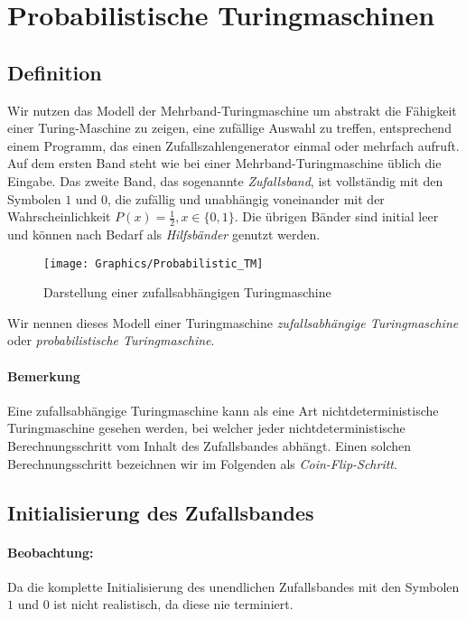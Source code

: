 \section{Probabilistische Turingmaschinen}
\subsection{Definition}
Wir nutzen das Modell der Mehrband-Turingmaschine um abstrakt die Fähigkeit einer Turing-Maschine zu zeigen, eine zufällige Auswahl zu treffen, entsprechend einem Programm, das einen Zufallszahlengenerator einmal oder mehrfach aufruft.
Auf dem ersten Band steht wie bei einer Mehrband-Turingmaschine üblich die Eingabe.
Das zweite Band, das sogenannte \emph{Zufallsband}, ist vollständig mit den Symbolen $1$ und $0$, die zufällig und unabhängig voneinander mit der Wahrscheinlichkeit $P(x) = \frac{1}{2}, x \in \{0, 1\}$.
Die übrigen Bänder sind initial leer und können nach Bedarf als \emph{Hilfsbänder} genutzt werden.

\begin{figure}[h]
	\centering
	\texttt{[image: Graphics/Probabilistic\_TM]}	
	\caption{Darstellung einer zufallsabhängigen Turingmaschine}
	\label{fig:probabilistic_tm}
\end{figure}

Wir nennen dieses Modell einer Turingmaschine \emph{zufallsabhängige Turingmaschine} oder \emph{probabilistische Turingmaschine}.

\paragraph{Bemerkung}
Eine zufallsabhängige Turingmaschine kann als eine Art nichtdeterministische Turingmaschine gesehen werden, bei welcher jeder nichtdeterministische Berechnungsschritt vom Inhalt des Zufallsbandes abhängt.
Einen solchen Berechnungsschritt bezeichnen wir im Folgenden als \emph{Coin-Flip-Schritt}.


\subsection{Initialisierung des Zufallsbandes}
\paragraph{Beobachtung:}
Da die komplette Initialisierung des unendlichen Zufallsbandes mit den Symbolen $1$ und $0$ ist nicht realistisch, da diese nie terminiert.

